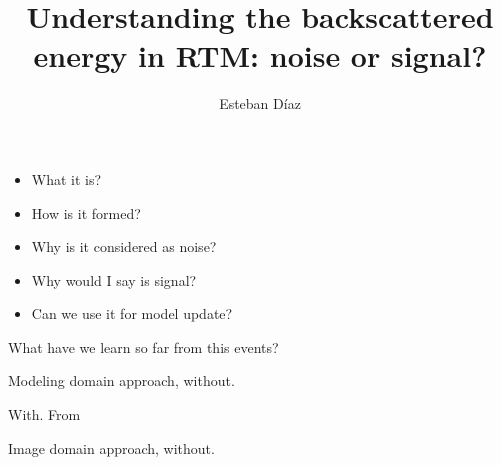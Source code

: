 




\title[]{Understanding the backscattered energy in RTM: noise or signal?}
\subtitle{}
\author[]{Esteban  D\'{i}az}
\date{}
\logo{}

\def\big#1{\begin{center} \LARGE \textbf{#1} \end{center}}
\def\cen#1{\begin{center}        \textbf{#1} \end{center}}

 { \cwpcover }


\begin{frame}
	\begin{itemize}
		\item What it is?  
		\item How is it formed?
		\item Why is it considered as noise?
		\item Why would I say is signal? 
		\item Can we use it for model update?
	\end{itemize}
\end{frame}




\begin{frame}
   What have we learn so far from this events?
\end{frame}

\begin{frame}
Modeling domain approach, without.
\end{frame}

\begin{frame}
With. From ~\cite{fletcher:2049}
\end{frame}

\begin{frame}
Image domain approach, without.
\end{frame}

